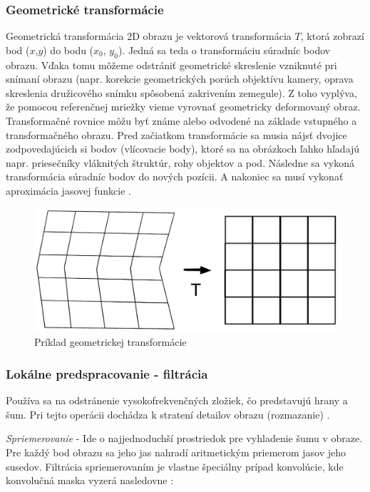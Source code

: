 \subsubsection{Geometrické transformácie}
Geometrická transformácia 2D obrazu je vektorová transformácia $T$, ktorá zobrazí bod ($x$,$y$) do bodu ($x_0$, $y_0$).  Jedná sa teda o transformáciu súradníc bodov obrazu. Vďaka tomu môžeme odstrániť geometrické skreslenie vzniknuté pri snímaní obrazu (napr. korekcie geometrických porúch objektívu kamery, oprava skreslenia družicového snímku spôsobená zakrivením zemegule).  Z toho vyplýva, že pomocou referenčnej mriežky vieme vyrovnať geometricky deformovaný obraz. Transformačné rovnice môžu byť známe alebo odvodené na základe vstupného a transformačného  obrazu. Pred začiatkom transformácie sa musia nájsť dvojice zodpovedajúcich si bodov (vlícovacie body), ktoré sa na obrázkoch ľahko hľadajú napr. priesečníky vláknitých štruktúr, rohy objektov a pod. Následne sa vykoná transformácia súradníc bodov do nových pozícii. A nakoniec sa musí vykonať aproximácia jasovej funkcie  \cite{Algorithms_and_Applications}.

\begin{figure}[H]
\begin{center}
	\includegraphics[scale=0.4]{images/transform}
	\caption{Príklad geometrickej transformácie}
	\end{center}
\end{figure}

\subsubsection{Lokálne predspracovanie - filtrácia}
Používa sa na odstránenie vysokofrekvenčných zložiek, čo predstavujú hrany a šum. Pri tejto operácii dochádza k stratení detailov obrazu (rozmazanie)  \cite{Detekcia_a_rozpoznavanie_objektov}.

\textit{Spriemerovanie} - Ide o najjednoduchší prostriedok pre vyhladenie šumu v obraze. Pre každý bod obrazu sa jeho jas nahradí aritmetickým priemerom jasov jeho susedov. Filtrácia spriemerovaním je vlastne špeciálny prípad konvolúcie, kde konvolučná maska vyzerá nasledovne \cite{Detekcia_a_rozpoznavanie_objektov}:

